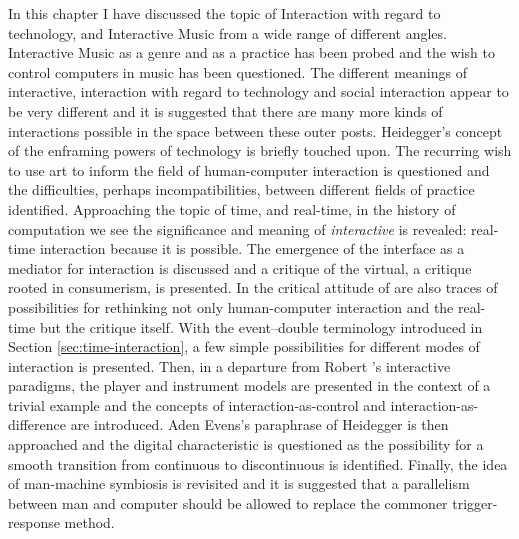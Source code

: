 In this chapter I have discussed the topic of Interaction with regard to technology, and Interactive Music from a wide range of different angles. Interactive Music as a genre and as a practice has been probed and the wish to control computers in music has been questioned. The different meanings of interactive, interaction with regard to technology and social interaction appear to be very different and it is suggested that there are many more kinds of interactions possible in the space between these outer posts. Heidegger's concept of the enframing powers of technology is briefly touched upon. The recurring wish to use art to inform the field of human-computer interaction is questioned and the difficulties, perhaps incompatibilities, between different fields of practice identified. Approaching the topic of time, and real-time, in the history of computation we see the significance and meaning of \emph{interactive} is revealed: real-time interaction because it is possible. The emergence of the interface as a mediator for interaction is discussed and a critique of the virtual, a critique rooted in consumerism, is presented. In the critical attitude of \citeauthor{baudrillard96:writing} are also traces of possibilities for rethinking not only human-computer interaction and the real-time but the critique itself. With the event--double terminology introduced in Section \ref{sec:time-interaction}, a few simple possibilities for different modes of interaction is presented. Then, in a departure from Robert \citeauthor{rowe01}'s interactive paradigms, the player and instrument models are presented in the context of a trivial example and the concepts of interaction-as-control and interaction-as-difference are introduced. Aden Evens's paraphrase of Heidegger is then approached and the digital characteristic is questioned as the possibility for a smooth transition from continuous to discontinuous is identified. Finally, the idea of man-machine symbiosis is revisited and it is suggested that a parallelism between man and computer should be allowed to replace the commoner trigger-response method.






